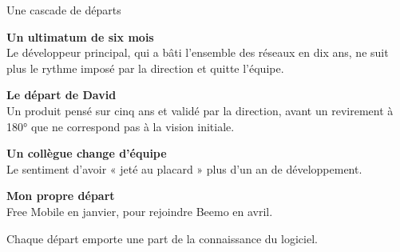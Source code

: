 \newcommand{\castep}[2]{%
  \noindent\raisebox{0.1ex}{\textcolor{accent}{\rule{1.5ex}{1.5ex}}}\hspace{0.4cm}%
  \begin{minipage}[t]{\dimexpr\textwidth-1.2cm\relax}%
    {\bfseries\fontsize{12}{15}\selectfont\color{ink}#1}\\[1pt]
    {\fontsize{10}{13}\selectfont\color{ink2}#2}\end{minipage}\par}

\begin{frame}{Une cascade de départs}
  \vspace{0.25cm}
  \castep{Un ultimatum de six mois}%
    {Le développeur principal, qui a bâti l'ensemble des réseaux en dix ans, ne suit plus le rythme imposé par la direction et quitte l'équipe.}
  \vspace{0.32cm}
  \castep{Le départ de David}%
    {Un produit pensé sur cinq ans et validé par la direction, avant un revirement à 180° que ne correspond pas à la vision initiale.}
  \vspace{0.32cm}
  \castep{Un collègue change d'équipe}%
    {Le sentiment d'avoir « jeté au placard » plus d'un an de développement.}
  \vspace{0.32cm}
  \castep{Mon propre départ}%
    {Free Mobile en janvier, pour rejoindre Beemo en avril.}
  \vspace{0.42cm}
  {\fontsize{10}{13}\selectfont\textcolor{muted}%
    {Chaque départ emporte une part de la connaissance du logiciel.}}
\end{frame}
